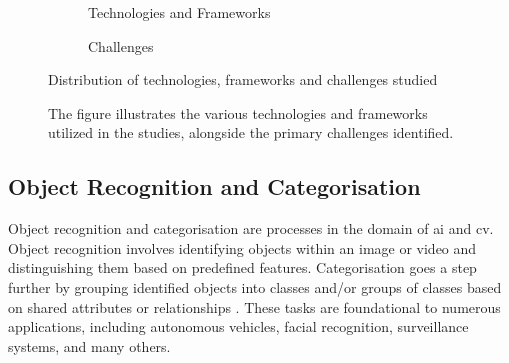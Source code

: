 \begin{figure}[!htb]
    \begin{subfigure}{1\linewidth}
        \centering
        \caption{Technologies and Frameworks}
    \end{subfigure}

    \vspace{0.5cm}

    \begin{subfigure}{1\linewidth}
        \centering
        \caption{Challenges}
    \end{subfigure}
    \centering
    \caption{Distribution of technologies, frameworks and challenges studied}
    \caption*{The figure illustrates the various technologies and frameworks utilized in the studies, alongside the primary challenges identified.}
    \label{fig:prisma_results}
\end{figure}

\subsection{Object Recognition and Categorisation} \label{subsec:object-recognition}

Object recognition and categorisation are processes in the domain of \ac{ai} and \ac{cv}. Object recognition involves identifying objects within an image or video and distinguishing them based on predefined features. Categorisation goes a step further by grouping identified objects into classes and/or groups of classes based on shared attributes or relationships \cite{Liu2021}. These tasks are foundational to numerous applications, including autonomous vehicles, facial recognition, surveillance systems, and many others.

